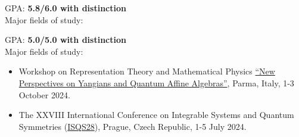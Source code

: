 \documentclass[10pt,a4paper,ragged2e,withhyper]{altacv}
\begin{document}
\begin{paracol}{2}
\medskip

{\color{ETHBlue80} GPA:} \textbf{5.8/6.0 with distinction}\\
{\color{ETHBlue80}Major fields of study:}     
 
\medskip
\smallskip

{\color{ETHBlue80} GPA:} \textbf{5.0/5.0 with distinction}\\
{\color{ETHBlue80}Major fields of study:}      
 
\newpage

\begin{itemize}
  \item Workshop on Representation Theory and Mathematical Physics \href{https://smfi.unipr.it/en/node/100218}{\color{ETHBlue120}``New Perspectives on Yangians and Quantum Affine Algebras''}, Parma, Italy, 1-3 October 2024.
  \item The XXVIII International Conference on Integrable Systems and Quantum Symmetries (\href{http://isqs.eu/}{\color{ETHBlue120}ISQS28}), Prague, Czech Republic, 1-5 July 2024.
\end{itemize}


\switchcolumn


\end{paracol}
\end{document}
